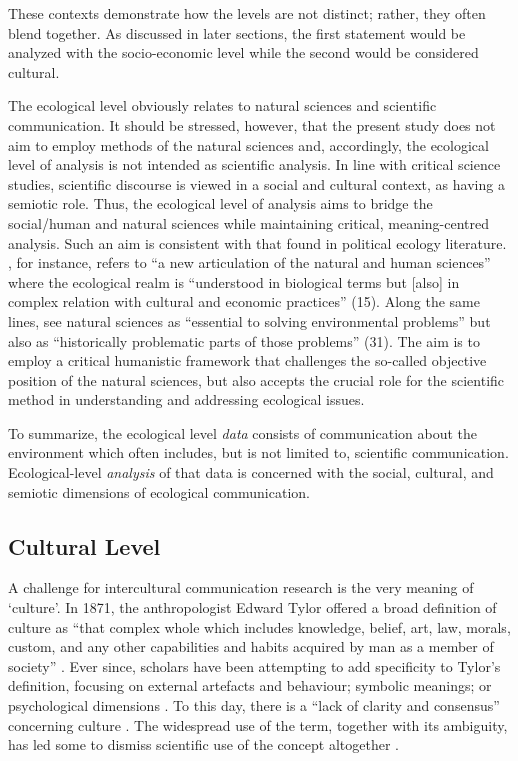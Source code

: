 These contexts demonstrate how the levels are not distinct; rather, they often blend together. As discussed in later sections, the first statement would be analyzed with the socio-economic level while the second would be considered cultural.  

The ecological level obviously relates to natural sciences and scientific communication. It should be stressed, however, that the present study does not aim to employ methods of the natural sciences and, accordingly, the ecological level of analysis is not intended as scientific analysis. In line with critical science studies, scientific discourse is viewed in a social and cultural context, as having a semiotic role. Thus, the ecological level of analysis aims to bridge the social/human and natural sciences while maintaining critical, meaning-centred analysis. Such an aim is consistent with that found in political ecology literature. \cite*{Escobar1999}, for instance, refers to ``a new articulation of the natural and human sciences'' where the ecological realm is ``understood in biological terms but [also] in complex relation with cultural and economic practices'' (15). Along the same lines, \cite*{Peet2011} see natural sciences as ``essential to solving environmental problems'' but also as ``historically problematic parts of those problems'' (31). The aim is to employ a critical humanistic framework that challenges the so-called objective position of the natural sciences, but also accepts the crucial role for the scientific method in understanding and addressing ecological issues. 

To summarize, the ecological level \textit{data} consists of communication about the environment which often includes, but is not limited to, scientific communication. Ecological-level \textit{analysis} of that data is concerned with the social, cultural, and semiotic dimensions of ecological communication.

\subsection{Cultural Level}

A challenge for intercultural communication research is the very meaning of `culture'. In 1871, the anthropologist Edward Tylor offered a broad definition of culture as ``that complex whole which includes knowledge, belief, art, law, morals, custom, and any other capabilities and habits acquired by man as a member of society'' \citep[1]{Tylor1871a}. Ever since, scholars have been attempting to add specificity to Tylor's definition, focusing on external artefacts and behaviour; symbolic meanings; or psychological dimensions \citep[see][for an overview]{Prinz2016b}. To this day, there is a ``lack of clarity and consensus'' concerning culture \citep[12]{Minkov2013a}. The widespread use of the term, together with its ambiguity, has led some to dismiss scientific use of the concept altogether \citep[e.g.,][]{Barber2008a}. 

